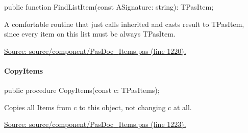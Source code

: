 \documentclass{report}
\newif\ifpdf
\begin{document}
\label{PasDoc_Items.TPasItems-FindListItem}
\begin{list}{}{
\setlength{\itemindent}{0cm}
\setlength{\listparindent}{0cm}
\setlength{\leftmargin}{\evensidemargin}
\addtolength{\leftmargin}{\tmplength}
\settowidth{\labelsep}{X}
\addtolength{\leftmargin}{\labelsep}
\setlength{\labelwidth}{\tmplength}
}
\item[\textbf{Declaration}\hfill]
\ifpdf
\begin{flushleft}
\fi
\begin{ttfamily}
public function FindListItem(const ASignature: string): TPasItem;\end{ttfamily}

\ifpdf
\end{flushleft}
\fi

\par
\item[\textbf{Description}]
A comfortable routine that just calls inherited and casts result to TPasItem, since every item on this list must be always TPasItem.\par
\href{https://github.com/pasdoc/pasdoc/blob/master/source/component/PasDoc_Items.pas#L1220}{Source: source/component/PasDoc{\_}Items.pas (line 1220).}

\end{list}
\paragraph*{CopyItems}\hspace*{\fill}

\label{PasDoc_Items.TPasItems-CopyItems}
\begin{list}{}{
\setlength{\itemindent}{0cm}
\setlength{\listparindent}{0cm}
\setlength{\leftmargin}{\evensidemargin}
\addtolength{\leftmargin}{\tmplength}
\settowidth{\labelsep}{X}
\addtolength{\leftmargin}{\labelsep}
\setlength{\labelwidth}{\tmplength}
}
\item[\textbf{Declaration}\hfill]
\ifpdf
\begin{flushleft}
\fi
\begin{ttfamily}
public procedure CopyItems(const c: TPasItems);\end{ttfamily}

\ifpdf
\end{flushleft}
\fi

\par
\item[\textbf{Description}]
Copies all Items from c to this object, not changing c at all.\par
\href{https://github.com/pasdoc/pasdoc/blob/master/source/component/PasDoc_Items.pas#L1223}{Source: source/component/PasDoc{\_}Items.pas (line 1223).}

\end{list}
\end{document}
